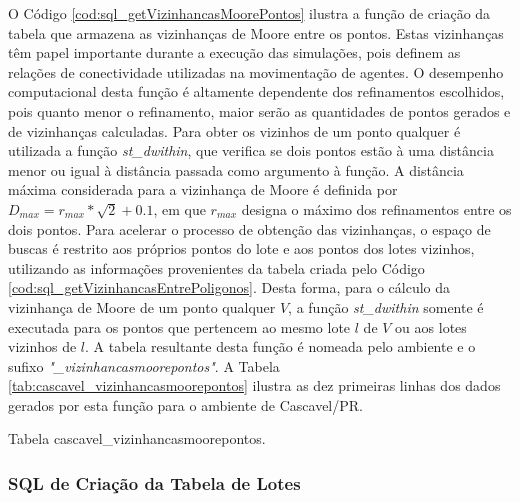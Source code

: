 O Código \ref{cod:sql_getVizinhancasMoorePontos} ilustra a função de criação da tabela que armazena as vizinhanças de Moore entre os pontos. Estas vizinhanças têm papel importante durante a execução das simulações, pois definem as relações de conectividade utilizadas na movimentação de agentes. O desempenho computacional desta função é altamente dependente dos refinamentos escolhidos, pois quanto menor o refinamento, maior serão as quantidades de pontos gerados e de vizinhanças calculadas. Para obter os vizinhos de um ponto qualquer é utilizada a função \textit{st\_dwithin}, que verifica se dois pontos estão à uma distância menor ou igual à distância passada como argumento à função. A distância máxima considerada para a vizinhança de Moore é definida por $D_{max} = r_{max} * \sqrt{2} + 0.1$, em que $r_{max}$ designa o máximo dos refinamentos entre os dois pontos. Para acelerar o processo de obtenção das vizinhanças, o espaço de buscas é restrito aos próprios pontos do lote e aos pontos dos lotes vizinhos, utilizando as informações provenientes da tabela criada pelo Código \ref{cod:sql_getVizinhancasEntrePoligonos}. Desta forma, para o cálculo da vizinhança de Moore de um ponto qualquer $V$, a função \textit{st\_dwithin} somente é executada para os pontos que pertencem ao mesmo lote $l$ de $V$ ou aos lotes vizinhos de $l$. A tabela resultante desta função é nomeada pelo ambiente e o sufixo \textit{"\_vizinhancasmoorepontos"}. A Tabela \ref{tab:cascavel_vizinhancasmoorepontos} ilustra as dez primeiras linhas dos dados gerados por esta função para o ambiente de Cascavel/PR.



\begin{table}[H]
\centering
{}
\caption{Tabela cascavel\_vizinhancasmoorepontos.}
\label{tab:cascavel_vizinhancasmoorepontos}
\end{table}

\subsubsection{SQL de Criação da Tabela de Lotes}

